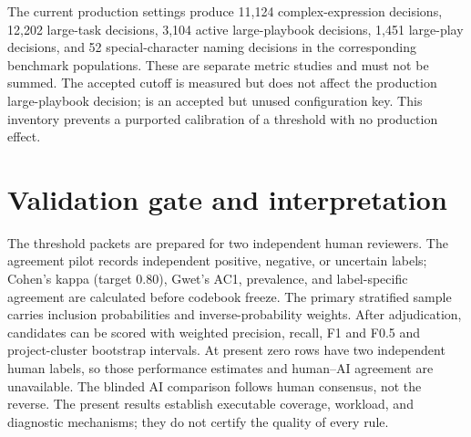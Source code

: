 The current production settings produce 11,124 complex-expression decisions,
12,202 large-task decisions, 3,104 active large-playbook decisions, 1,451
large-play decisions, and 52 special-character naming decisions in the
corresponding benchmark populations. These are separate metric studies and
must not be summed. The accepted  cutoff is measured
but does not affect the production large-playbook decision;
 is an accepted but unused configuration key. This
inventory prevents a purported calibration of a threshold with no production
effect.

\section{Validation gate and interpretation}
The threshold packets are prepared for two independent human reviewers.
The agreement pilot records independent positive, negative, or uncertain
labels; Cohen's kappa (target 0.80), Gwet's AC1, prevalence, and label-specific
agreement are calculated before codebook freeze. The primary stratified
sample carries inclusion probabilities and inverse-probability weights.
After adjudication, candidates can be scored with weighted precision, recall,
F1 and F0.5 and project-cluster bootstrap intervals. At present zero rows have
two independent human labels, so those performance estimates and human--AI
agreement are unavailable. The blinded AI comparison follows human consensus,
not the reverse. The present results establish executable coverage, workload,
and diagnostic mechanisms; they do not certify the quality of every rule.
